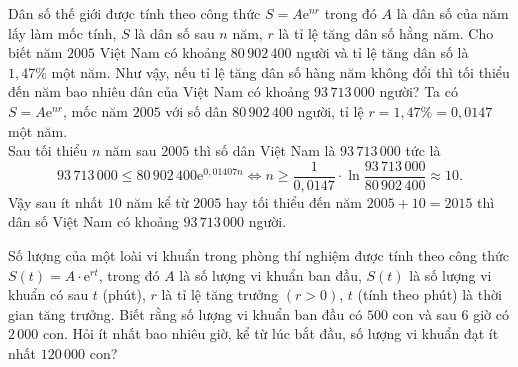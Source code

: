 \begin{bt}%
Dân số thế giới được tính theo công thức $S=A\mathrm{e}^{nr}$ trong đó $A$ là dân số của năm lấy làm mốc tính, $S$ là dân số sau $n$ năm, $r$ là tỉ lệ tăng dân số hằng năm. Cho biết năm $2005$ Việt Nam có khoảng $80\,902\,400$ người và tỉ lệ tăng dân số là $1{,}47\%$ một năm. Như vậy, nếu tỉ lệ tăng dân số hàng năm không đổi thì tối thiểu đến năm bao nhiêu dân của Việt Nam có khoảng $93\,713\,000$ người?
\loigiai
{
Ta có $S=A\mathrm{e}^{nr}$, mốc năm $2005$ với số dân $80\,902\,400$ người, tỉ lệ $r=1{,}47\%=0{,}0147$ một năm.\\
Sau tối thiểu $n$ năm sau $2005$ thì số dân Việt Nam là $93\,713\,000$ tức là
$$93\,713\,000\leqslant 80\,902\,400\mathrm{e}^{0{,}01407n} \Leftrightarrow n\geqslant \dfrac{1}{0{,}0147}\cdot\ln \dfrac{93\,713\,000}{80\,902\,400}\approx 10.$$
Vậy sau ít nhất $10$ năm kể từ $2005$ hay tối thiểu đến năm $2005+10=2015$ thì dân số Việt Nam có khoảng $93\,713\,000$ người.
}
\end{bt}

\begin{bt}%
	Số lượng của một loài vi khuẩn trong phòng thí nghiệm được tính theo công thức $S(t)=A \cdot \mathrm{e}^{rt}$, trong đó $A$ là số lượng vi khuẩn ban đầu, $S(t)$ là số lượng vi khuẩn có sau $t$ (phút), $r$ là tỉ lệ tăng trưởng $(r>0)$, $t$ (tính theo phút) là thời gian tăng trưởng. Biết rằng số lượng vi khuẩn ban đầu có $500$ con và sau $6$ giờ có $2\,000$ con. Hỏi ít nhất bao nhiêu giờ, kể từ lúc bắt đầu, số lượng vi khuẩn đạt ít nhất $120 \, 000$ con?
\end{bt}

